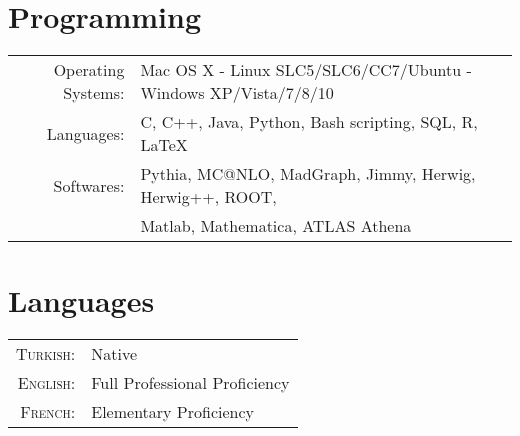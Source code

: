 \documentclass[a4paper,10pt]{article}
\begin{document}
\vspace{3mm}
\section{Programming}
\begin{tabular}{rl}
Operating Systems: 	& Mac OS X - Linux SLC5/SLC6/CC7/Ubuntu - Windows XP/Vista/7/8/10 	\\
Languages: 		& C, C++, Java, Python, Bash scripting, SQL, R, \LaTeX				\\
Softwares: 		& Pythia, MC@NLO, MadGraph, Jimmy, Herwig, Herwig++, ROOT,		\\
				& Matlab, Mathematica, ATLAS Athena 							\\
\end{tabular}

\vspace{3mm}
\section{Languages}

\begin{tabular}{rl}
\textsc{Turkish:}	& Native					\\
\textsc{English:}	& Full Professional Proficiency	\\
\textsc{French:}		& Elementary Proficiency		\\
\end{tabular}
\end{document}
